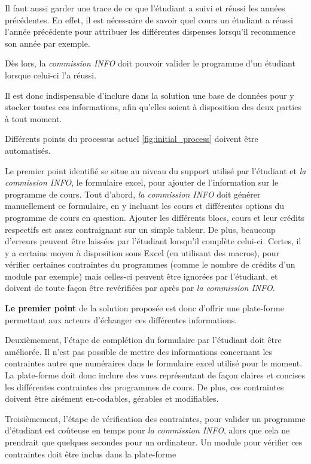 Il faut aussi garder une trace de ce que l'étudiant a suivi et réussi les années précédentes. En effet, il est nécessaire de savoir quel cours un étudiant a réussi l'année précédente pour attribuer les différentes dispenses lorsqu'il recommence son année par exemple.

Dès lors, la \textit{commission INFO} doit pouvoir valider le programme d'un étudiant lorsque celui-ci l'a réussi. 

Il est donc indispensable d'inclure dans la solution une base de données pour y stocker toutes ces informations, afin qu'elles soient à disposition des deux parties à tout moment.

Différents points du processus actuel \ref{fig:initial_process} doivent être automatisés.

Le premier point identifié se situe au niveau du support utilisé par l'étudiant et \textit{la commission INFO}, le formulaire excel, pour ajouter de l'information sur le programme de cours. Tout d'abord, \textit{la commission INFO} doit générer manuellement ce formulaire, en y incluant les cours et différentes options du programme de cours en question. Ajouter les différents blocs, cours et leur crédits respectifs est assez contraignant sur un simple tableur. De plus, beaucoup d'erreurs peuvent être laissées par l'étudiant lorsqu'il complète celui-ci. Certes, il y a certains moyen à disposition sous Excel (en utilisant des macros), pour vérifier certaines contraintes du programmes (comme le nombre de crédits d'un module par exemple) mais celles-ci peuvent être ignorées par l'étudiant, et doivent de toute façon être revérifiées par après par \textit{la commission INFO}. 

\textbf{Le premier point} de la solution proposée est donc d’offrir une plate-forme permettant aux acteurs d'échanger ces différentes informations.

Deuxièmement, l'étape de complétion du formulaire par l'étudiant doit être améliorée. Il n'est pas possible de mettre des informations concernant les contraintes autre que numéraires dans le formulaire excel utilisé pour le moment. La plate-forme doit donc inclure des vues représentant de façon claires et concises les différentes contraintes des programmes de cours. De plus, ces contraintes doivent être aisément en-codables, gérables et modifiables. 

Troisièmement, l'étape de vérification des contraintes, pour valider un programme d'étudiant est coûteuse en temps pour \textit{la commission INFO}, alors que cela ne prendrait que quelques secondes pour un ordinateur. Un module pour vérifier ces contraintes doit être inclus dans la plate-forme

